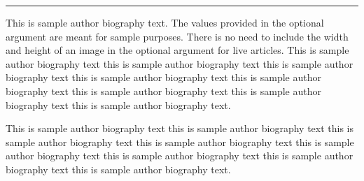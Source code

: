 \documentclass[unnumsec,webpdf,contemporary,large]{oup-authoring-template}%
\theoremstyle{thmstyleone}%
\theoremstyle{thmstyletwo}%
\theoremstyle{thmstylethree}%
\begin{document}
\begin{biography}{{\color{black!20}\rule{77pt}{57pt}}}{\author{Author Name.} This is sample author biography text. The values provided in the optional argument are meant for sample purposes. There is no need to include the width and height of an image in the optional argument for live articles. This is sample author biography text this is sample author biography text this is sample author biography text this is sample author biography text this is sample author biography text this is sample author biography text this is sample author biography text this is sample author biography text.}
\end{biography}

\begin{biography}{}{\author{Author Name.} This is sample author biography text this is sample author biography text this is sample author biography text this is sample author biography text this is sample author biography text this is sample author biography text this is sample author biography text this is sample author biography text.}
\end{biography}

\end{document}
